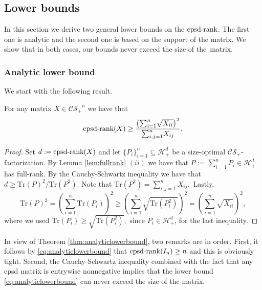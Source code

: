 \documentclass{siamart}
\begin{document}
{{{\subsection{Lower bounds}\label{sec:lowerbounds}

In this section we derive two general lower bounds on the ${\mathrm{cpsd}\textnormal{-rank}}$.
The first one is analytic  and the second one is based on the
support of the matrix. We show that in both cases, our  bounds never
exceed the size of the~matrix.

\subsubsection{Analytic lower bound} We start with  the following result. 

\medskip

\begin{theorem}\label{thm:analyticlowerbound}
For any matrix $X\in {\mathcal{CS}_+}^n$ we have that
\begin{equation}\label{eq:analyticlowerbound}
{\mathrm{cpsd}\textnormal{-rank}}(X)\ge { \left({\sum_{i =1}^n} \sqrt{X_{ii}}\right)^2\over {\sum_{i,j = 1}^n} X_{ij}}.
\end{equation}
\end{theorem}

\begin{proof}{Set  $d:= {\mathrm{cpsd}\textnormal{-rank}}(X)$ and let   $\{P_i\}_{i=1}^n \subseteq {\mathcal{H}}^d_+$ be a size-optimal  ${\mathcal{CS}_+}$-factorization}. By Lemma \ref{lem:fullrank}  $(ii)$  we have that  $P:=\sum_{i=1}^nP_i\in {\mathcal{H}}^d_+$ has full-rank. By the  Cauchy-Schwartz inequality  we have  that  $d\ge {\mathrm{Tr}}(P)^2/{\mathrm{Tr}}(P^2)$.
Note  that ${\mathrm{Tr}}(P^2)
=\sum_{i,j=1}^nX_{ij}$.~Lastly,
\[
{\mathrm{Tr}}(P)^2=\left(\sum_{i=1}^n{\mathrm{Tr}}(P_i)\right)^2\ge\left(\sum_{i=1}^n\sqrt{{\mathrm{Tr}}(P_i^2)}\right)^2 {= \left( \sum_{i=1}^n \sqrt{X_{ii}} \right)^2},
\]
where we used ${\mathrm{Tr}}(P_i)\ge\sqrt{{\mathrm{Tr}}(P_i^2)},$ since $P_i\in{\mathcal{H}}^d_+$, {for the last inequality}.
\end{proof}
\vspace{0.1cm} 

In view of Theorem \ref{thm:analyticlowerbound}, two  remarks are in
order. First, it follows by \eqref{eq:analyticlowerbound} that
${\mathrm{cpsd}\textnormal{-rank}}(I_n)\ge n$ and {this is} obviously  tight.
{Second}, the Cauchy-Schwartz inequality combined with the fact
{that} any cpsd matrix is entrywise nonnegative {implies} that
the lower bound \eqref{eq:analyticlowerbound}  can never exceed  the
size of the matrix.

}}}
\end{document}
